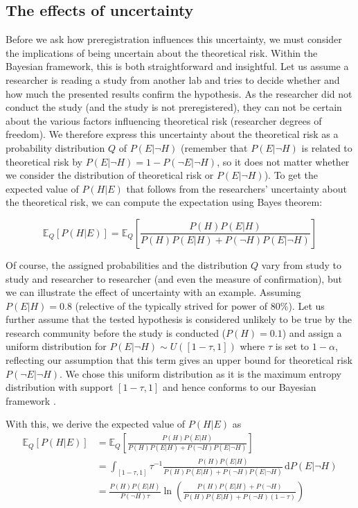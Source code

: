 \documentclass[jou,a4paper]{apa7}
\begin{document}
\subsection{The effects of uncertainty} 

Before we ask how preregistration influences this uncertainty, we must consider the implications of being uncertain about the theoretical risk.
Within the Bayesian framework, this is both straightforward and insightful.
Let us assume a researcher is reading a study from another lab and tries to decide whether and how much the presented results confirm the hypothesis.
As the researcher did not conduct the study (and the study is not preregistered), they can not be certain about the various factors influencing theoretical risk (researcher degrees of freedom).
We therefore express this uncertainty about the theoretical risk as a probability distribution $Q$ of $P(E|\neg{}H)$ (remember that $P(E|\neg{}H)$ is related to theoretical risk by $P(E|\neg{}H) = 1 - P(\neg{}E|\neg{}H)$, so it does not matter whether we consider the distribution of theoretical risk or $P(E|\neg{}H)$).
To get the expected value of $P(H|E)$ that follows from the researchers' uncertainty about the theoretical risk, we can compute the expectation using Bayes theorem:

\begin{equation}
\mathbb{E}_Q[P(H|E)] = \mathbb{E}_Q \left[ \frac{P(H)P(E|H)}{P(H)P(E|H)+P(\neg H) P(E|\neg H) } \right] \label{eq:integral}
\end{equation}

Of course, the assigned probabilities and the distribution $Q$ vary from study to study and researcher to researcher (and even the measure of confirmation), but we can illustrate the effect of uncertainty with an example.
Assuming $P(E|H) = 0.8$ (relective of the typically strived for power of 80\%).
Let us further assume that the tested hypothesis is considered unlikely to be true by the research community before the study is conducted ($P(H) = 0.1$) and assign a uniform distribution for $P(E|\neg{}H) \sim U([1-\tau, 1])$ where $\tau{}$ is set to $1 - \alpha$, reflecting our assumption that this term gives an upper bound for theoretical risk $P(\neg{}E|\neg{}H)$.
We chose this uniform distribution as it is the maximum entropy distribution with support $[1-\tau, 1]$ and hence conforms to our Bayesian framework \parencite{giffinUpdatingProbabilitiesData2007}.

With this, we derive the expected value of $P(H|E)$ as
\begin{align}
\mathbb{E}_Q[P(H|E)] &= \mathbb{E}_Q \left[ \frac{P(H)P(E|H)}{P(H)P(E|H)+P(\neg H) P(E|\neg H) } \right] \\[1em]
&= \int_{[1-\tau, 1]} \tau^{-1} \frac{P(H)P(E|H)}{P(H)P(E|H)+P(\neg H) P(E|\neg H) } \, \mathrm{d} P(E|\neg H) \\[1em]
&= \frac{P(H)P(E|H)}{P(\neg{}H)\tau}\ln \left(\frac{P(H)P(E|H) + P(\neg{}H)}{P(H)P(E|H) + P(\neg{}H)(1-\tau)}\right)\label{eq:expectation}
\end{align}
\end{document}

